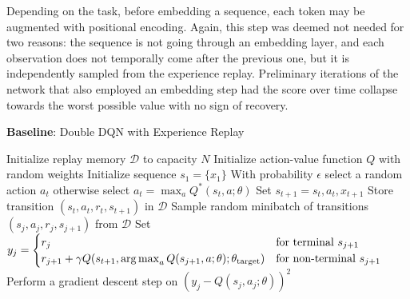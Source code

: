 Depending on the task, before embedding a sequence, each token may be augmented with positional encoding. Again, this step was deemed not needed for two reasons: the sequence is not going through an embedding layer, and each observation does not temporally come after the previous one, but it is independently sampled from the experience replay. Preliminary iterations of the network that also employed an embedding step had the score over time collapse towards the worst possible value with no sign of recovery.

\begin{algorithm}
\caption{\textbf{Baseline}: Double DQN with Experience Replay \cite{dqn1,dqn2,double_dqn}}
\label{alg:baseline}
\begin{algorithmic}
\State Initialize replay memory $\mathcal{D}$ to capacity $N$
\State Initialize action-value function $Q$ with random weights
\State Initialize sequence $s_1 = \{ x_1 \}$
\State With probability $\epsilon$ select a random action $a_t$
\State otherwise select $a_t = \max_a Q^*(s_t, a; \theta)$
\State Set $s_{t+1} = s_t, a_t, x_{t+1}$
\State Store transition $(s_t, a_t, r_t, s_{t+1})$ in $\mathcal{D}$
\State Sample random minibatch of transitions $(s_j, a_j, r_j, s_{j+1})$ from $\mathcal{D}$
\State Set $ y_j =
\begin{cases}
r_j &\text{for terminal } s_{j+1} \\
r_{j+1} + \gamma Q(s_{t+1}, \operatorname*{arg\,max}_{a} Q(s_{j+1}, a; \theta); \theta_{\text{target}}) &\text{for non-terminal } s_{j+1}
\end{cases}
$
\State Perform a gradient descent step on $(y_j - Q(s_j, a_j; \theta))^2$
\EndFor
\EndFor
\end{algorithmic}
\end{algorithm}
